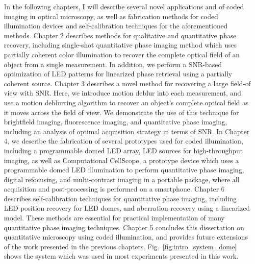 In the following chapters, I will describe several novel applications and of coded imaging in optical microscopy, as well as fabrication methods for coded illumination devices and self-calibration techniques for the aforementioned methods. Chapter 2 describes methods for qualitative and quantitative phase recovery, including single-shot quantitative phase imaging method which uses partially coherent color illumination to recover the complete optical field of an object from a single measurement. In addition, we perform a SNR-based optimization of LED patterns for linearized phase retrieval using a partially coherent source. Chapter 3 describes a novel method for recovering a large field-of view with SNR. Here, we introduce motion deblur into each measurement, and use a motion deblurring algorithm to recover an object's complete optical field as it moves across the field of view. We demonstrate the use of this technique for brightfield imaging, fluorescence imaging, and quantitative phase imaging, including an analysis of optimal acquisition strategy in terms of SNR. In Chapter 4, we describe the fabrication of several prototypes used for coded illumination, including a programmable domed LED array, LED sources for high-throughput imaging, as well as Computational CellScope, a prototype device which uses a programmable domed LED illumination to perform quantitative phase imaging, digital refocusing, and multi-contrast imaging in a portable package, where all acquisition and post-processing is performed on a smartphone. Chapter 6 describes self-calibration techniques for quantitative phase imaging, including LED position recovery for LED domes, and aberration recovery using a linearized model. These methods are essential for practical implementation of many quantitative phase imaging techniques. Chapter 5 concludes this dissertation on quantitative microscopy using coded illumination, and provides future extensions of the work presented in the previous chapters. Fig.~\ref{fig:intro_system_dome} shows the system which was used in most experiments presented in this work.

